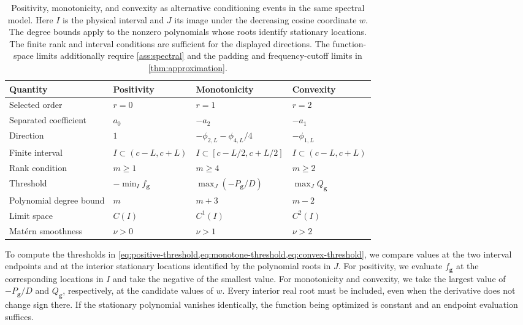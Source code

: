 \begin{table}[htbp]
\centering
\setlength{\tabcolsep}{4pt}
\begin{tabular}{llll}
\toprule
Quantity & Positivity & Monotonicity & Convexity\\
\midrule
Selected order & $r=0$ & $r=1$ & $r=2$\\
Separated coefficient & $a_0$ & $-a_2$ & $-a_1$\\
Direction & $1$ & $-\phi_{2,L}-\phi_{4,L}/4$ & $-\phi_{1,L}$\\
Finite interval & $I\subset(c-L,c+L)$ & $I\subset[c-L/2,c+L/2]$ & $I\subset(c-L,c+L)$\\
Rank condition & $m\geq1$ & $m\geq4$ & $m\geq2$\\
Threshold & $-\min_I f_{\boldsymbol g}$ & $\max_J(-P_{\boldsymbol g}/D)$ & $\max_J Q_{\boldsymbol g}$\\
Polynomial degree bound & $m$ & $m+3$ & $m-2$\\
Limit space & $C(I)$ & $C^1(I)$ & $C^2(I)$\\
Mat\'ern smoothness & $\nu>0$ & $\nu>1$ & $\nu>2$\\
\bottomrule
\end{tabular}
\caption{Positivity, monotonicity, and convexity as alternative
conditioning events in the same spectral model. Here $I$ is the physical
interval and $J$ its image under the decreasing cosine coordinate $w$.
The degree bounds apply to the nonzero polynomials whose roots identify
stationary locations.
The finite rank and
interval conditions are sufficient for the displayed directions. The
function-space limits additionally require \cref{ass:spectral} and the
padding and frequency-cutoff limits in \cref{thm:approximation}.}
\label{tab:cases}
\end{table}

To compute the thresholds in
\cref{eq:positive-threshold,eq:monotone-threshold,eq:convex-threshold},
we compare values at the two interval endpoints and at the interior
stationary locations identified by the polynomial roots in $J$.
For positivity, we evaluate $f_{\boldsymbol g}$ at the corresponding
locations in $I$ and take the negative of the smallest value. For
monotonicity and convexity, we take the largest value of
$-P_{\boldsymbol g}/D$ and $Q_{\boldsymbol g}$, respectively, at the
candidate values of $w$. Every interior real root must be included,
even when the derivative does not change sign there. If the stationary
polynomial vanishes identically, the function being optimized is
constant and an endpoint evaluation suffices.

